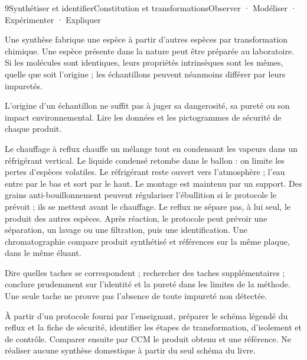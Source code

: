 \begin{ouverture}[synthese]{9}{Synthétiser et identifier}{Constitution et transformations}{Observer · Modéliser · Expérimenter · Expliquer}
\end{ouverture}
\essentiel
{}
Une synthèse fabrique une espèce à partir d'autres espèces par transformation chimique. Une espèce présente dans la nature peut être préparée au laboratoire. Si les molécules sont identiques, leurs propriétés intrinsèques sont les mêmes, quelle que soit l'origine ; les échantillons peuvent néanmoins différer par leurs impuretés.
\begin{attention}L'origine d'un échantillon ne suffit pas à juger sa dangerosité, sa pureté ou son impact environnemental. Lire les données et les pictogrammes de sécurité de chaque produit.\end{attention}
Le chauffage à reflux chauffe un mélange tout en condensant les vapeurs dans un réfrigérant vertical. Le liquide condensé retombe dans le ballon : on limite les pertes d'espèces volatiles. Le réfrigérant reste ouvert vers l'atmosphère ; l'eau entre par le bas et sort par le haut.
Le montage est maintenu par un support. Des grains anti-bouillonnement peuvent régulariser l'ébullition si le protocole le prévoit ; ils se mettent avant le chauffage. Le reflux ne sépare pas, à lui seul, le produit des autres espèces.
Après réaction, le protocole peut prévoir une séparation, un lavage ou une filtration, puis une identification. Une chromatographie compare produit synthétisé et références sur la même plaque, dans le même éluant.
\begin{savoirfaire}[Argumenter]Dire quelles taches se correspondent ; rechercher des taches supplémentaires ; conclure prudemment sur l'identité et la pureté dans les limites de la méthode. Une seule tache ne prouve pas l'absence de toute impureté non détectée.\end{savoirfaire}
\begin{experience}À partir d'un protocole fourni par l'enseignant, préparer le schéma légendé du reflux et la fiche de sécurité, identifier les étapes de transformation, d'isolement et de contrôle. Comparer ensuite par CCM le produit obtenu et une référence. Ne réaliser aucune synthèse domestique à partir du seul schéma du livre.\end{experience}
